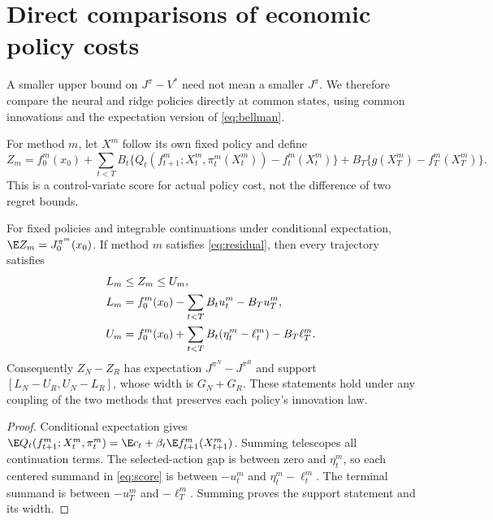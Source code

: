 \documentclass[ecta,nameyear,draft]{econsocart}
\begin{document}
\section{Direct comparisons of economic policy costs}\label{sec:paired}
A smaller upper bound on $J^\pi-V^*$ need not mean a smaller $J^\pi$. We therefore compare the neural and ridge policies directly at common states, using common innovations and the expectation version of \eqref{eq:bellman}.

For method $m$, let $X^m$ follow its own fixed policy and define
\begin{equation}\label{eq:score}
 Z_m=f_0^m(x_0)+\sum_{t<T}B_t
  \{Q_t(f_{t+1}^m;X_t^m,\pi_t^m(X_t^m))-f_t^m(X_t^m)\}
       +B_T\{g(X_T^m)-f_T^m(X_T^m)\}.
\end{equation}
This is a control-variate score for actual policy cost, not the difference of two regret bounds.

\begin{theorem}\label{thm:paired}
For fixed policies and integrable continuations under conditional expectation,
$\E Z_m=J^{\pi^m}_0(x_0)$. If method $m$ satisfies \eqref{eq:residual}, then every trajectory satisfies
\begin{align}\label{eq:support}
 L_m&\leq Z_m\leq U_m,\\
 L_m&=f_0^m(x_0)-\sum_{t<T}B_tu_t^m-B_Tu_T^m,\notag\\
 U_m&=f_0^m(x_0)+\sum_{t<T}B_t(\eta_t^m-\ell_t^m)-B_T\ell_T^m.\notag
\end{align}
Consequently $Z_N-Z_R$ has expectation $J^{\pi^N}-J^{\pi^R}$ and support
$[L_N-U_R,U_N-L_R]$, whose width is $G_N+G_R$. These statements hold under any coupling of the two methods that preserves each policy's innovation law.
\end{theorem}

\begin{proof}
Conditional expectation gives $\E Q_t(f_{t+1}^m;X_t^m,\pi_t^m)=\E c_t+\beta_t\E f_{t+1}^m(X_{t+1}^m)$. Summing telescopes all continuation terms. The selected-action gap is between zero and $\eta_t^m$, so each centered summand in \eqref{eq:score} is between $-u_t^m$ and $\eta_t^m-\ell_t^m$. The terminal summand is between $-u_T^m$ and $-\ell_T^m$. Summing proves the support statement and its width.
\end{proof}
\end{document}
